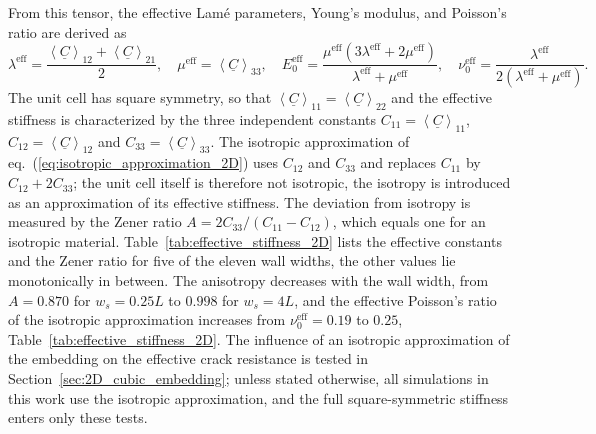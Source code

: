 \documentclass[pdflatex,sn-mathphys-num]{sn-jnl}%
\theoremstyle{thmstyleone}%
\theoremstyle{thmstyletwo}%
\theoremstyle{thmstylethree}%
\begin{document}
From this tensor, the effective Lamé parameters, Young’s modulus, and Poisson’s ratio are derived as
\begin{equation}
    \lambda^{\text{eff}} = \dfrac{\left< \underline{C} \right>_{12} + \left< \underline{C} \right>_{21}}{2}, \quad
    \mu^{\text{eff}} = \left< \underline{C} \right>_{33}, \quad
    E_0^{\text{eff}} = \dfrac{\mu^{\text{eff}} (3 \lambda^{\text{eff}} + 2 \mu^{\text{eff}})}{\lambda^{\text{eff}} + \mu^{\text{eff}}}, \quad
    \nu_0^{\text{eff}} = \dfrac{\lambda^{\text{eff}}}{2 (\lambda^{\text{eff}} + \mu^{\text{eff}})}.
    \label{eq:isotropic_approximation_2D}
\end{equation}
The unit cell has square symmetry, so that $\left< \underline{C} \right>_{11} = \left< \underline{C} \right>_{22}$ and the effective stiffness is characterized by the three independent constants $C_{11} = \left< \underline{C} \right>_{11}$, $C_{12} = \left< \underline{C} \right>_{12}$ and $C_{33} = \left< \underline{C} \right>_{33}$. The isotropic approximation of eq.~(\ref{eq:isotropic_approximation_2D}) uses $C_{12}$ and $C_{33}$ and replaces $C_{11}$ by $C_{12} + 2C_{33}$; the unit cell itself is therefore not isotropic, the isotropy is introduced as an approximation of its effective stiffness. The deviation from isotropy is measured by the Zener ratio $A = 2C_{33}/(C_{11} - C_{12})$, which equals one for an isotropic material. Table~\ref{tab:effective_stiffness_2D} lists the effective constants and the Zener ratio for five of the eleven wall widths, the other values lie monotonically in between. The anisotropy decreases with the wall width, from $A = 0.870$ for $w_s = 0.25L$ to $0.998$ for $w_s = 4L$, and the effective Poisson's ratio of the isotropic approximation increases from $\nu_0^{\text{eff}} = 0.19$ to $0.25$, Table~\ref{tab:effective_stiffness_2D}. The influence of an isotropic approximation of the embedding on the effective crack resistance is tested in Section~\ref{sec:2D_cubic_embedding}; unless stated otherwise, all simulations in this work use the isotropic approximation, and the full square-symmetric stiffness enters only these tests.
\end{document}
